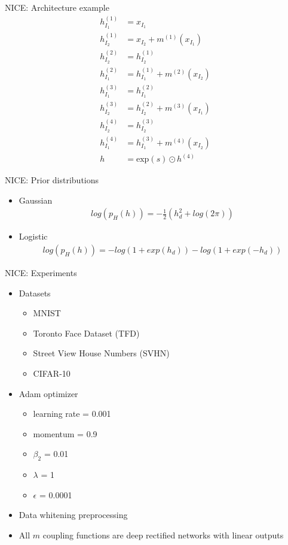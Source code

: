 \begin{frame}{NICE: Architecture example}
\begin{align*}
    h_{I_1}^{(1)} &= x_{I_1}\\
    h_{I_2}^{(1)} &= x_{I_2} + m^{(1)}(x_{I_1})\\ 
    h_{I_2}^{(2)} &= h_{I_2}^{(1)}\\
    h_{I_1}^{(2)} &= h_{I_1}^{(1)} + m^{(2)}(x_{I_2})\\ 
    h_{I_1}^{(3)} &= h_{I_1}^{(2)}\\
    h_{I_2}^{(3)} &= h_{I_2}^{(2)} + m^{(3)}(x_{I_1})\\ 
    h_{I_2}^{(4)} &= h_{I_2}^{(3)}\\
    h_{I_1}^{(4)} &= h_{I_1}^{(3)} + m^{(4)}(x_{I_2})\\ 
    h &= \text{exp}(s) \odot h^{(4)}
\end{align*}
\end{frame}
\begin{frame}{NICE: Prior distributions}
    \begin{itemize}
        \item Gaussian
        \begin{align*}
            log(p_H(h)) = -\frac{1}{2}(h_d^2 + log(2\pi))
        \end{align*}
        \item Logistic
        \begin{align*}
            log(p_H(h)) = - log(1+exp(h_d)) - log(1+exp(-h_d))
        \end{align*}
    \end{itemize}
\end{frame}
\begin{frame}{NICE: Experiments}
    \begin{itemize}
        \item Datasets
        \begin{itemize}
            \item MNIST
            \item Toronto Face Dataset (TFD)
            \item Street View House Numbers (SVHN)
            \item CIFAR-10
        \end{itemize}
        \item Adam optimizer
            \begin{itemize}
                \item learning rate = 0.001 
                \item momentum = 0.9 
                \item $\beta_2$ = 0.01 
                \item $\lambda$ = 1 
                \item $\epsilon$ = 0.0001 
            \end{itemize}
        \item Data whitening preprocessing
        \item All $m$ coupling functions are deep rectified networks with linear outputs
    \end{itemize}
\end{frame}
